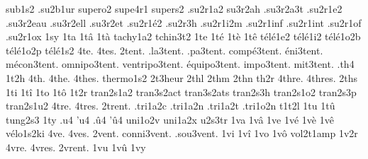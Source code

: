 {                    sub1s2
                    .su2b1ur
                    supero2
                    supe4r1
                    supers2
                    .su2r1a2
                    su3r2ah
                    .su3r2a3t
                    .su2r1e2
                    .su3r2eau
                    .su3r2ell
                    .su3r2et
                    .su2r1é2
                    .su2r3h
                    .su2r1i2m
                    .su2r1inf
                    .su2r1int
                    .su2r1of
                    .su2r1ox
1sy
1ta
1tâ
1tà
                    tachy1a2
                    tchin3t2
1te
1té
1tè
1tê
                    télé1e2
                    télé1i2
                    télé1o2b
                    télé1o2p
                    télé1s2
4te.
4tes.
        2tent. %
     .la3tent.
     .pa3tent.
   compé3tent.
     éni3tent.
   mécon3tent.
  omnipo3tent.
ventripo3tent.
  équipo3tent.
    impo3tent.
     mit3tent.
%
.th4
1t2h
4th.
4the.
4thes.
                    thermo1s2
                    2t3heur
2thl %
2thm
2thn
th2r
4thre.
4thres.
2ths
1ti
1tî
1to
1tô
1t2r
                    tran2s1a2
                    tran3s2act
                    tran3s2ats
                    tran2s3h
                    tran2s1o2
                    tran2s3p
                    tran2s1u2
4tre.
4tres.
2trent. %
                    .tri1a2c
                    .tri1a2n
                    .tri1a2t
                    .tri1o2n
                    t1t2l
1tu
1tû
tung2s3
1ty
.u4
'u4
.û4
'û4
                    uni1o2v
                    uni1a2x
                    u2s3tr
1va
1vâ
1ve
1vé
1vè
1vê
                    vélo1s2ki
4ve.
4ves.
     2vent.
conni3vent.
 .sou3vent.
%
1vi
1vî
1vo
1vô
                    vol2t1amp
1v2r
4vre.
4vres.
2vrent. %
1vu
1vû
1vy
}
